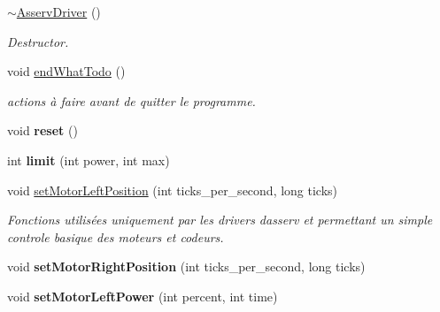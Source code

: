 \begin{DoxyCompactItemize}
\mbox{\label{classAsservDriver_a5960b3ced1e727d33ded6ff469fc1a78}} 
\hyperlink{classAsservDriver_a5960b3ced1e727d33ded6ff469fc1a78}{$\sim$\+Asserv\+Driver} ()
\begin{DoxyCompactList}\small\item\em Destructor. \end{DoxyCompactList}\item 
\mbox{\label{classAsservDriver_a636bf5413d2cf0419f188a4965340758}} 
void \hyperlink{classAsservDriver_a636bf5413d2cf0419f188a4965340758}{end\+What\+Todo} ()
\begin{DoxyCompactList}\small\item\em actions à faire avant de quitter le programme. \end{DoxyCompactList}\item 
\mbox{\label{classAsservDriver_af36a7173937151f268540614cddcd641}} 
void {\bfseries reset} ()
\item 
\mbox{\label{classAsservDriver_a97a107b23d634ed1a800a0ede7161baf}} 
int {\bfseries limit} (int power, int max)
\item 
\mbox{\label{classAsservDriver_a06e66d6e5607c2268174b0c1aa0a4c77}} 
void \hyperlink{classAsservDriver_a06e66d6e5607c2268174b0c1aa0a4c77}{set\+Motor\+Left\+Position} (int ticks\+\_\+per\+\_\+second, long ticks)
\begin{DoxyCompactList}\small\item\em Fonctions utilisées uniquement par les drivers d\textquotesingle{}asserv et permettant un simple controle basique des moteurs et codeurs. \end{DoxyCompactList}\item 
\mbox{\label{classAsservDriver_ac8e1e6be69102f2bad8b0a599c61b155}} 
void {\bfseries set\+Motor\+Right\+Position} (int ticks\+\_\+per\+\_\+second, long ticks)
\item 
\mbox{\label{classAsservDriver_adf3b38a6392b2b46094cd22209a67111}} 
void {\bfseries set\+Motor\+Left\+Power} (int percent, int time)
\item 
\mbox{\label{classAsservDriver_a7bb525dfc34c7b0d94e5ccd6b38f49f8}} 

\end{DoxyCompactItemize}
